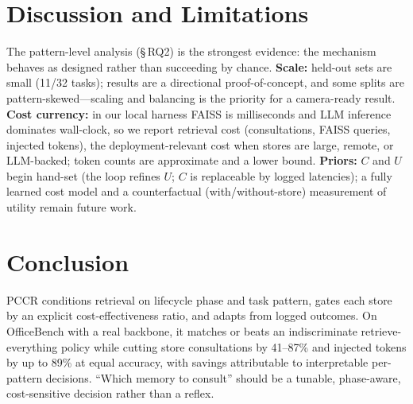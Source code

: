 \documentclass[10pt,twocolumn]{article}
\begin{document}
\section{Discussion and Limitations}
The pattern-level analysis (\S\,RQ2) is the strongest evidence: the mechanism
behaves as designed rather than succeeding by chance. \textbf{Scale:} held-out
sets are small (11/32 tasks); results are a directional proof-of-concept, and
some splits are pattern-skewed---scaling and balancing is the priority for a
camera-ready result. \textbf{Cost currency:} in our local harness FAISS is
milliseconds and LLM inference dominates wall-clock, so we report retrieval cost
(consultations, FAISS queries, injected tokens), the deployment-relevant cost
when stores are large, remote, or LLM-backed; token counts are approximate and a
lower bound. \textbf{Priors:} $C$ and $U$ begin hand-set (the loop refines $U$; $C$
is replaceable by logged latencies); a fully learned cost model and a
counterfactual (with/without-store) measurement of utility remain future work.

\section{Conclusion}
PCCR conditions retrieval on lifecycle phase and task pattern, gates each store
by an explicit cost-effectiveness ratio, and adapts from logged outcomes. On
OfficeBench with a real backbone, it matches or beats an indiscriminate
retrieve-everything policy while cutting store consultations by 41--87\% and
injected tokens by up to 89\% at equal accuracy, with savings attributable to
interpretable per-pattern decisions. ``Which memory to consult'' should be a
tunable, phase-aware, cost-sensitive decision rather than a reflex.
\end{document}
